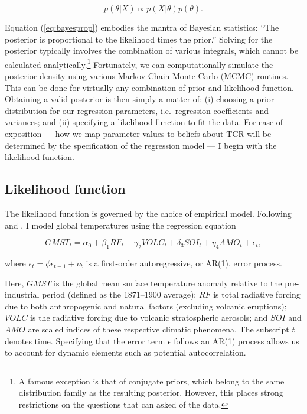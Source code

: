 \documentclass[smallextended]{svjour3}       %
\begin{document}
\begin{equation}
    p(\theta|X) \propto p(X|\theta)p(\theta). \label{eq:bayesprop}
\end{equation}

Equation (\ref{eq:bayesprop}) embodies the mantra of Bayesian
statistics: ``The posterior is proportional to the likelihood times the
prior.'' Solving for the posterior typically involves the combination of
various integrals, which cannot be calculated analytically.\footnote{A
  famous exception is that of conjugate priors, which belong to the same
  distribution family as the resulting posterior. However, this places
  strong restrictions on the questions that can asked of the data.}
Fortunately, we can computationally simulate the posterior density using
various Markov Chain Monte Carlo (MCMC) routines. This can be done for
virtually any combination of prior and likelihood function. Obtaining a
valid posterior is then simply a matter of: (i) choosing a prior
distribution for our regression parameters, i.e.~regression coefficients
and variances; and (ii) specifying a likelihood function to fit the
data. For ease of exposition --- how we map parameter values to beliefs
about TCR will be determined by the specification of the regression
model --- I begin with the likelihood function.

\hypertarget{sec:likelihood}{%
\subsection{Likelihood function}\label{sec:likelihood}}

The likelihood function is governed by the choice of empirical model.
Following \cite{estrada2012breaks} and \cite{estrada2013statistically},
I model global temperatures using the regression equation

\begin{equation}
   GMST_t = \alpha_0 + \beta_1RF_t + \gamma_2VOLC_t + \delta_3SOI_t + \eta_4AMO_t + \epsilon_t, \label{eq:regression}
\end{equation}

where \(\epsilon_t = \phi \epsilon_{t-1} + \nu_t\) is a first-order
autoregressive, or AR(1), error process.

Here, \(GMST\) is the global mean surface temperature anomaly relative
to the pre-industrial period (defined as the 1871--1900 average); \(RF\)
is total radiative forcing due to both anthropogenic and natural factors
(excluding volcanic eruptions); \(VOLC\) is the radiative forcing due to
volcanic stratospheric aerosols; and \(SOI\) and \(AMO\) are scaled
indices of these respective climatic phenomena. The subscript \(t\)
denotes time. Specifying that the error term \(\epsilon\) follows an
AR(1) process allows us to account for dynamic elements such as
potential autocorrelation.
\end{document}
